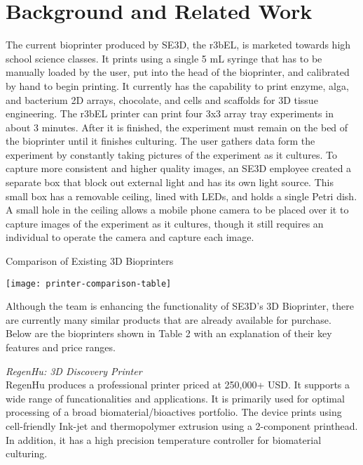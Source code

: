 
\section{Background and Related Work}

The current bioprinter produced by SE3D, the r3bEL, is marketed towards high school science classes. It prints using a single 5 mL syringe that has to be manually loaded by the user, put into the head of the bioprinter, and calibrated by hand to begin printing. It currently has the capability to print enzyme, alga, and bacterium 2D arrays, chocolate, and cells and scaffolds for 3D tissue engineering. The r3bEL printer can print four 3x3 array tray experiments in about 3 minutes. After it is finished, the experiment must remain on the bed of the bioprinter until it finishes culturing. The user gathers data form the experiment by constantly taking pictures of the experiment as it cultures. To capture more consistent and higher quality images, an SE3D employee created a separate box that block out external light and has its own light source. This small box has a removable ceiling, lined with LEDs, and holds a single Petri dish. A small hole in the ceiling allows a mobile phone camera to be placed over it to capture images of the experiment as it cultures, though it still requires an individual to operate the camera and capture each image.


\begin{table}[H]
\caption{\label{table:printer-comparison} Comparison of Existing 3D Bioprinters}
\texttt{[image: printer-comparison-table]}
\end{table}
Although the team is enhancing the functionality of SE3D’s 3D Bioprinter, there are currently many similar products that are already available for purchase. Below are the bioprinters shown in Table 2 with an explanation of their key features and price ranges.



\textit{RegenHu: 3D Discovery Printer} \\
RegenHu produces a professional printer priced at 250,000+ USD. It supports a wide range of funcationalities and applications. It is primarily used for optimal processing of a broad biomaterial/bioactives portfolio. The device prints using cell-friendly Ink-jet and thermopolymer extrusion using a 2-component printhead. In addition, it has a high precision temperature controller for biomaterial culturing.

